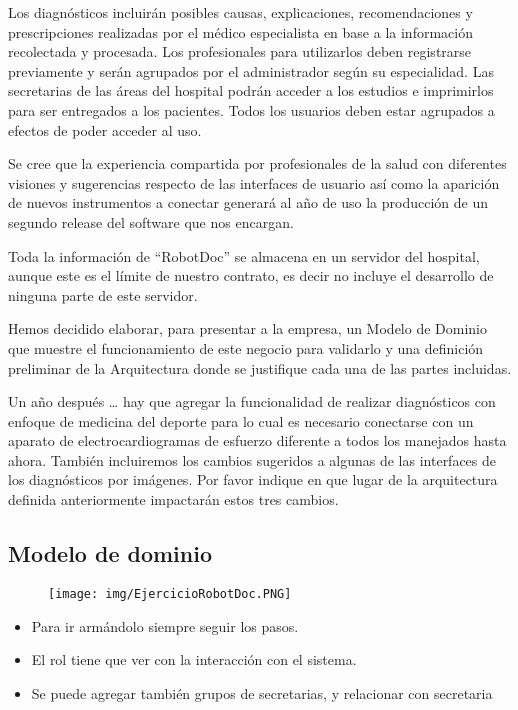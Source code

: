 \medskip
Los diagnósticos incluirán posibles causas, explicaciones, recomendaciones y prescripciones realizadas por 
el médico especialista en base a la información recolectada y procesada. Los profesionales para utilizarlos 
deben registrarse previamente y serán agrupados por el administrador según su especialidad. Las secretarias 
de las áreas del hospital podrán acceder a los estudios e imprimirlos para ser entregados a los pacientes. 
Todos los usuarios deben estar agrupados a efectos de poder acceder al uso.

\medskip
Se cree que la experiencia compartida por profesionales de la salud con diferentes visiones y sugerencias 
respecto de las interfaces de usuario así como la aparición de nuevos instrumentos a conectar generará al año
de uso la producción de un segundo release del software que nos encargan.

\medskip
Toda la información de “RobotDoc” se almacena en un servidor del hospital, aunque este es el límite de 
nuestro contrato, es decir no incluye el desarrollo de ninguna parte de este servidor.

\medskip
Hemos decidido elaborar, para presentar a la empresa, un Modelo de Dominio que muestre el 
funcionamiento de este negocio para validarlo y una definición preliminar de la Arquitectura donde se 
justifique cada una de las partes incluidas. 

\medskip
Un año después … hay que agregar la funcionalidad de realizar diagnósticos con enfoque de medicina del 
deporte para lo cual es necesario conectarse con un aparato de electrocardiogramas de esfuerzo diferente a 
todos los manejados hasta ahora. También incluiremos los cambios sugeridos a algunas de las interfaces de 
los diagnósticos por imágenes. Por favor indique en que lugar de la arquitectura definida anteriormente 
impactarán estos tres cambios.

\subsection*{Modelo de dominio}

\begin{figure}[!htb]
    \centering
    \texttt{[image: img/EjercicioRobotDoc.PNG]}
\end{figure}


\begin{itemize}
\item Para ir armándolo siempre seguir los pasos.
\item El rol tiene que ver con la interacción con el sistema.
\item Se puede agregar también grupos de secretarias, y relacionar con secretaria
\end{itemize}

